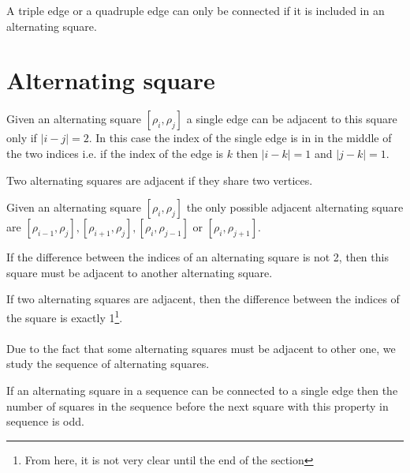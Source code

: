 \begin{proposition}
  \label{continue-triple-edge}
  A triple edge or a quadruple edge can only be connected if it is included in an alternating square.
\end{proposition}

\section{Alternating square}

\begin{proposition}
  \label{square-connection}
  Given an alternating square $[\rho_i, \rho_j]$ a single edge can be adjacent to this square only if $|i - j| = 2$. In this case the index of the single edge is in in the middle of the two indices i.e. if the index of the edge is $k$ then $|i-k| = 1$ and $|j-k| = 1$.
\end{proposition}

\begin{definition}
  Two alternating squares are adjacent if they share two vertices.
\end{definition}

\begin{proposition}
  \label{adjacent-squares}
  Given an alternating square $[\rho_i, \rho_j]$ the only possible adjacent alternating square are $[\rho_{i-1}, \rho_j], [\rho_{i+1}, \rho_j], [\rho_i, \rho_{j-1}]$ or $[\rho_i, \rho_{j+1}]$.
\end{proposition}

\begin{corollary}
  \label{continue-alternating-square}
  If the difference between the indices of an alternating square is not 2, then this square must be adjacent to another alternating square.
\end{corollary}

\begin{corollary}
  If two alternating squares are adjacent, then the difference between the indices of the square is exactly 1\footnote{From here, it is not very clear until the end of the section}.
\end{corollary}

\paragraph{}
Due to the fact that some alternating squares must be adjacent to other one, we study the sequence of alternating squares.

\begin{corollary}
  \label{parity-sequence-squares}
  If an alternating square in a sequence can be connected to a single edge then the number of squares in the sequence before the next square with this property in sequence is odd.
\end{corollary}

